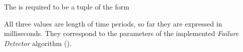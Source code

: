     The  is required to be a tuple of the form
    \begin{quote}
    \end{quote}
    All three values are length of time periods, so far they are expressed
    in milliseconds. They correspond to the parameters of the implemented
    \emph{Failure Detector} algorithm ().
 
